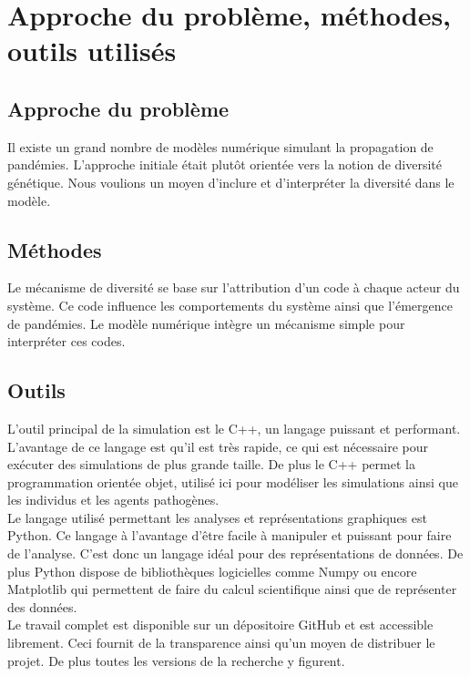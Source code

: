 \chapter{Approche du problème, méthodes, outils utilisés} \label{ch:approche}

\section{Approche du problème}
Il existe un grand nombre de modèles numérique simulant la propagation de pandémies. L'approche initiale était plutôt orientée vers la notion de diversité génétique. Nous voulions un moyen d'inclure et d'interpréter la diversité dans le modèle.

\section{Méthodes}
Le mécanisme de diversité se base sur l'attribution d'un code à chaque acteur du système. Ce code influence les comportements du système ainsi que l'émergence de pandémies. Le modèle numérique intègre un mécanisme simple pour interpréter ces codes.

\section{Outils}
L'outil principal de la simulation est le C++, un langage puissant et performant. L'avantage de ce langage est qu'il est très rapide, ce qui est nécessaire pour exécuter des simulations de plus grande taille. De plus le C++ permet la programmation orientée objet, utilisé ici pour modéliser les simulations ainsi que les individus et les agents pathogènes.\\

Le langage utilisé permettant les analyses et représentations graphiques est Python. Ce langage à l'avantage d'être facile à manipuler et puissant pour faire de l'analyse. C'est donc un langage idéal pour des représentations de données. De plus Python dispose de bibliothèques logicielles comme Numpy ou encore Matplotlib qui permettent de faire du calcul scientifique ainsi que de représenter des données.\\

Le travail complet est disponible sur un dépositoire GitHub et est accessible librement. Ceci fournit de la transparence ainsi qu'un moyen de distribuer le projet. De plus toutes les versions de la recherche y figurent.
